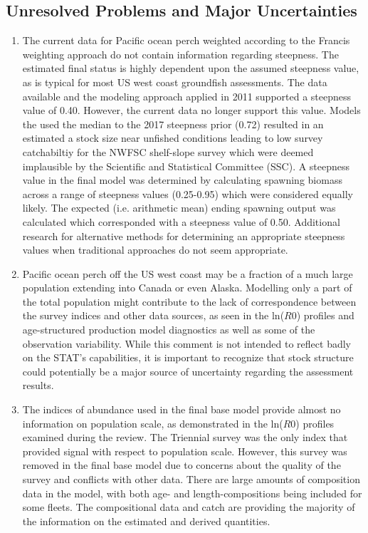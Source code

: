 \documentclass[12pt,]{article}
\begin{document}
\FloatBarrier

\subsection*{Unresolved Problems and Major
Uncertainties}\label{unresolved-problems-and-major-uncertainties}

\begin{enumerate}

\item The current data for Pacific ocean perch weighted according to the Francis weighting approach do not contain information regarding steepness.  The estimated final status is highly dependent upon the assumed steepness value, as is typical for most US west coast groundfish assessments.  The data available and the modeling approach applied in 2011 supported a steepness value of 0.40.  However, the current data no longer support this value.  Models the used the median to the 2017 steepness prior (0.72) resulted in an estimated a stock size near unfished conditions leading to low survey catchabiltiy for the NWFSC shelf-slope survey which were deemed implausible by the Scientific and Statistical Committee (SSC).  A steepness value in the final model was determined by calculating spawning biomass across a range of steepness values (0.25-0.95) which were considered equally likely.  The expected (i.e. arithmetic mean) ending spawning output was calculated which corresponded with a steepness value of 0.50.  Additional research for alternative methods for determining an appropriate steepness values when traditional approaches do not seem appropriate.  

\item Pacific ocean perch off the US west coast may be a fraction of a much large population extending into Canada or even Alaska. Modelling only a part of the total population might contribute to the lack of correspondence between the survey indices and other data sources, as seen in the ln($R0$) profiles and age-structured production model diagnostics as well as some of the observation variability. While this comment is not intended to reflect badly on the STAT's capabilities, it is important to recognize that stock structure could potentially be a major source of uncertainty regarding the assessment results.
  
\item The indices of abundance used in the final base model provide almost no information on population scale, as demonstrated in the ln($R0$) profiles examined during the review. The Triennial survey was the only index that provided signal with respect to population scale. However, this survey was removed in the final base model due to concerns about the quality of the survey and conflicts with other data. There are large amounts of composition data in the model, with both age- and length-compositions being included for some fleets. The compositional data and catch are providing the majority of the information on the estimated and derived quantities.


\end{enumerate}
\end{document}
